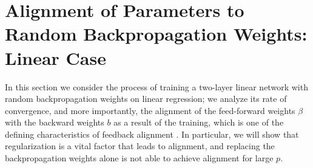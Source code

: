 \section{Alignment of Parameters to Random Backpropagation Weights: Linear Case}

In this section we consider the process of training a two-layer linear network with random backpropagation weights on linear regression; we analyze its rate of convergence, and more importantly, the alignment of the feed-forward weights $\beta$ with the backward weights $b$ as a result of the training, which is one of the defining characteristics of feedback alignment \citep{lillicrap2016random}. In particular, we will show that regularization is a vital factor that leads to alignment, and replacing the backpropagation weights alone is not able to achieve alignment for large $p$.

